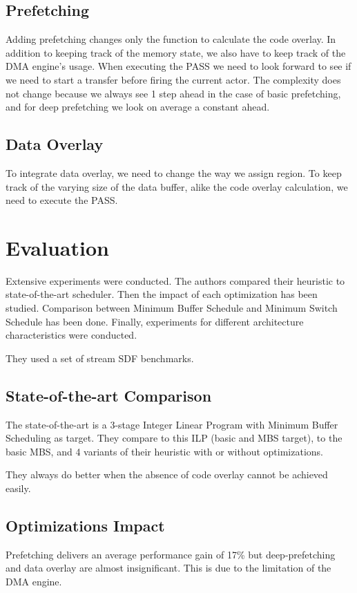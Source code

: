 \documentclass{article}
\begin{document}
\subsection{Prefetching}
Adding prefetching changes only the function to calculate the code overlay.
In addition to keeping track of the memory state, we also have to keep track of the DMA engine's usage.
When executing the PASS we need to look forward to see if we need to start a transfer before firing the current actor.
The complexity does not change because we always see 1 step ahead in the case of basic prefetching, and for deep prefetching we look on average a constant ahead.

\subsection{Data Overlay}
To integrate data overlay, we need to change the way we assign region.
To keep track of the varying size of the data buffer, alike the code overlay calculation, we need to execute the PASS\@.

\section{Evaluation}
\label{evaluation}
Extensive experiments were conducted.
The authors compared their heuristic to state-of-the-art scheduler.
Then the impact of each optimization has been studied.
Comparison between Minimum Buffer Schedule and Minimum Switch Schedule has been done.
Finally, experiments for different architecture characteristics were conducted.

They used a set of stream SDF benchmarks.

\subsection{State-of-the-art Comparison}
The state-of-the-art is a 3-stage Integer Linear Program with Minimum Buffer Scheduling as target.
They compare to this ILP (basic and MBS target), to the basic MBS, and 4 variants of their heuristic with or without optimizations.

They always do better when the absence of code overlay cannot be achieved easily.

\subsection{Optimizations Impact}
Prefetching delivers an average performance gain of 17\% but deep-prefetching and data overlay are almost insignificant.
This is due to the limitation of the DMA engine.
\end{document}
